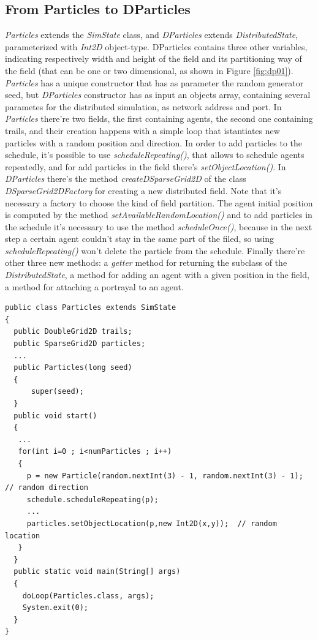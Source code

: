 \documentclass[12pt]{article}
\begin{document}
\subsection{From Particles to DParticles}
\textit{Particles} extends the \textit{SimState} class,  and \textit{DParticles} extends \textit{DistributedState}, parameterized with \textit{Int2D} object-type.
DParticles contains three other variables, indicating respectively width and height of the field and its partitioning way of the field (that can be one or two dimensional, as shown in Figure \ref{fig:dp01}). \textit{Particles} has a unique constructor that has as parameter the random generator seed, but \textit{DParticles} constructor has as input an objects array, containing several parametes for the distributed simulation, as network address and port. In \textit{Particles} there're two fields, the first containing agents, the second one containing trails, and their creation happens with a simple loop that istantiates new particles with a random position and direction. In order to add particles to the schedule, it's possible to use \textit{scheduleRepeating()}, that allows to schedule agents repeatedly, and for add particles in the field there's \textit{setObjectLocation()}. In \textit{DParticles} there's the method \textit{createDSparseGrid2D} of the class \textit{DSparseGrid2DFactory} for creating a new distributed field. Note that it's necessary a factory to choose the kind of field partition. The agent initial position is computed by the method \textit{setAvailableRandomLocation()} and to add particles in the schedule it's necessary to use the method \textit{scheduleOnce()}, because in the next step a certain agent couldn't stay in the same part of the filed, so using \textit{scheduleRepeating()} won't delete the particle from the schedule. Finally there're other three new methods: a \textit{getter} method for returning the subclass of the \textit{DistributedState}, a method for adding an agent with a given position in the field, a method for attaching a portrayal to an agent.
\begin{lstlisting}
public class Particles extends SimState 
{
  public DoubleGrid2D trails;
  public SparseGrid2D particles;
  ...
  public Particles(long seed)
  {
      super(seed);
  }
  public void start()
  {
   ...
   for(int i=0 ; i<numParticles ; i++)
   {
     p = new Particle(random.nextInt(3) - 1, random.nextInt(3) - 1);  // random direction
     schedule.scheduleRepeating(p);
     ...
     particles.setObjectLocation(p,new Int2D(x,y));  // random location
   }
  }
  public static void main(String[] args)
  {
    doLoop(Particles.class, args);
    System.exit(0);
  }
}
\end{lstlisting}
\end{document}
